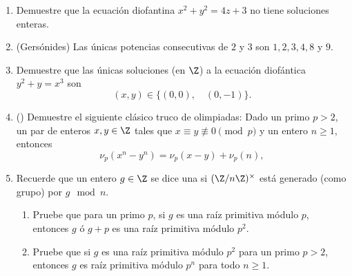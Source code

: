 \documentclass[11pt, reqno]{amsart}
\begin{document}
\begin{enumerate}
	\item Demuestre que la ecuación diofantina $x^2 + y^2 = 4z + 3$ no tiene soluciones enteras.
	\item (Gersónides)
		Las únicas potencias consecutivas de $2$ y $3$ son $1, 2, 3, 4, 8$ y $9$.

	\item Demuestre que las únicas soluciones (en $\Z$) a la ecuación diofántica $y^2 + y = x^3$ son
		\[
			(x, y) \in \{ (0, 0), \quad (0, -1) \}.
		\] %




	\item\lookright ()
		Demuestre el siguiente clásico truco de olimpiadas:
		Dado un primo $p > 2$, un par de enteros $x, y \in \Z$ tales que $x \equiv y \not\equiv 0 \pmod p$ y un entero $n \ge 1$,
		entonces
		\[
			\nu_p(x^n - y^n) = \nu_p(x - y) + \nu_p(n),
		\]

	\item Recuerde que un entero $g \in \Z$ se dice una  si $(\Z/n\Z)^\times$ está generado (como grupo)
		por $g \mod n$.
		\begin{enumerate}
			\item Pruebe que para un primo $p$, si $g$ es una raíz primitiva módulo $p$, entonces $g$ ó $g + p$ es una raíz
				primitiva módulo $p^2$.

			\item Pruebe que si $g$ es una raíz primitiva módulo $p^2$ para un primo $p > 2$, entonces $g$ es raíz primitiva
				módulo $p^n$ para todo $n \ge 1$.
		\end{enumerate}


\end{enumerate}
\end{document}
